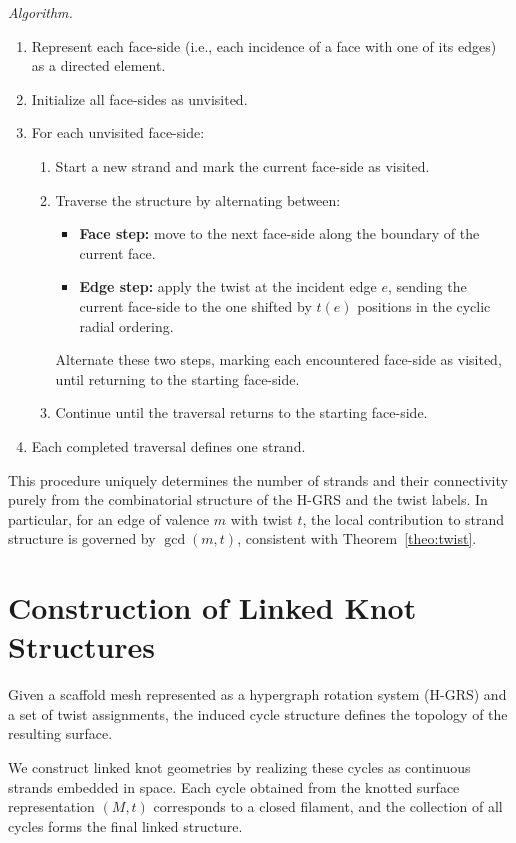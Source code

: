 \documentclass[acmtog]{acmart}
\begin{document}
\textit{Algorithm.}
\begin{enumerate}
    \item Represent each face-side (i.e., each incidence of a face with one of its edges) as a directed element.
    \item Initialize all face-sides as unvisited.
    \item For each unvisited face-side:
    \begin{enumerate}
        \item Start a new strand and mark the current face-side as visited.
        \item Traverse the structure by alternating between:
        \begin{itemize}
            \item \textbf{Face step:} move to the next face-side along the boundary of the current face.
            \item \textbf{Edge step:} apply the twist at the incident edge $e$, sending the current face-side to the one shifted by $t(e)$ positions in the cyclic radial ordering. 
        \end{itemize}
        Alternate these two steps, marking each encountered face-side as visited, until returning to the starting face-side.
        \item Continue until the traversal returns to the starting face-side.
    \end{enumerate}
    \item Each completed traversal defines one strand.
\end{enumerate}

This procedure uniquely determines the number of strands and their connectivity purely from the combinatorial structure of the H-GRS and the twist labels. In particular, for an edge of valence $m$ with twist $t$, the local contribution to strand structure is governed by $\gcd(m, t)$, consistent with Theorem~\ref{theo:twist}.

\section{Construction of Linked Knot Structures}


Given a scaffold mesh represented as a hypergraph rotation system
(H-GRS) and a set of twist assignments, the induced cycle structure
defines the topology of the resulting surface.

We construct linked knot geometries by realizing these cycles as
continuous strands embedded in space. Each cycle obtained from the
knotted surface representation $(M,t)$ corresponds to a closed filament, and the collection of all cycles forms the final linked
structure.
\end{document}
